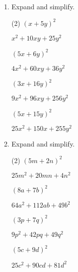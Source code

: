 \begin{enumerate} [leftmargin=0cm]
\item Expand and simplify.
\begin{tasks}[label=(\alph*), after-item-skip=2pt,after-skip=3pt, label-width=4ex](2)
    \task  $ ( x+ 5y)^2  $    \\  \begin{envAnswer} $   x^2 +  10xy +  25y^2      $ \end{envAnswer}
    \task  $ (5x+ 6y)^2  $    \\  \begin{envAnswer} $  4x^2 +  60xy +  36y^2      $ \end{envAnswer}
    \task  $ (3x+16y)^2  $    \\  \begin{envAnswer} $  9x^2 +  96xy + 256y^2      $ \end{envAnswer}
    \task  $ (5x+15y)^2  $    \\  \begin{envAnswer} $ 25x^2 +  150x + 255y^2      $ \end{envAnswer}
\end{tasks}


\item Expand and simplify.
\begin{tasks}[label=(\alph*), after-item-skip=2pt,after-skip=3pt, label-width=4ex](2)
    \task  $ (5m+ 2n)^2  $    \\  \begin{envAnswer} $ 25m^2 +  20mn +   4n^2      $ \end{envAnswer}
    \task  $ (8a+ 7b)^2  $    \\  \begin{envAnswer} $ 64a^2 + 112ab +  49b^2      $ \end{envAnswer}
    \task  $ (3p+ 7q)^2  $    \\  \begin{envAnswer} $  9p^2 +  42pq +  49q^2      $ \end{envAnswer}
    \task  $ (5c+ 9d)^2  $    \\  \begin{envAnswer} $ 25c^2 +  90cd +  81d^2      $ \end{envAnswer}
\end{tasks}






\end{enumerate}
